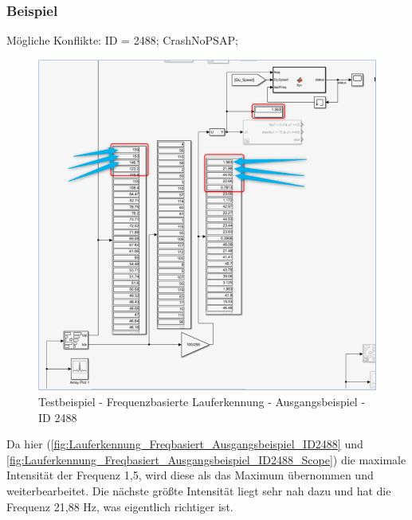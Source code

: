 \subsubsection{Beispiel}
Mögliche Konflikte: ID = 2488; CrashNoPSAP;\\

\begin{figure}[H]
	\centering
	\includegraphics[width=\linewidth]{Bilder/Lauferkennung_Freqbasiert_Ausgangsbeispiel.png}
	\caption{Testbeispiel - Frequenzbasierte Lauferkennung - Ausgangsbeispiel - ID 2488}
	\label{fig:Lauferkennung_Freqbasiert_Ausgangsbeispiel_ID2488}
\end{figure}
Da hier (\autoref{fig:Lauferkennung_Freqbasiert_Ausgangsbeispiel_ID2488} und \autoref{fig:Lauferkennung_Freqbasiert_Ausgangsbeispiel_ID2488_Scope}) die maximale Intensität der Frequenz 1,5, wird diese als das Maximum übernommen und weiterbearbeitet. Die nächste größte Intensität liegt sehr nah dazu und hat die Frequenz 21,88 Hz, was eigentlich richtiger ist.

